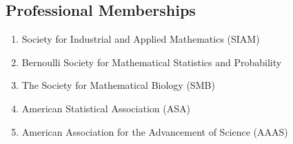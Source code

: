 \documentclass[11pt,a4paper,sans]{moderncv}        %
\begin{document}
\subsection{Professional Memberships}
\begin{enumerate}
	\item {Society for Industrial and Applied Mathematics (SIAM)}
	\item {Bernoulli Society for Mathematical Statistics and Probability}
	\item{The Society for Mathematical Biology (SMB)}
	\item{American Statistical Association (ASA)}
	\item {American Association for the Advancement of Science (AAAS)}
\end{enumerate}








\end{document}
